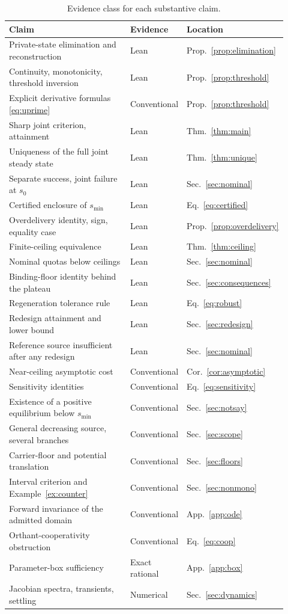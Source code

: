 \documentclass[11pt,a4paper]{article}
\theoremstyle{plain}
\theoremstyle{definition}
\theoremstyle{remark}
\begin{document}
\begin{table}[tb]
\centering\small
\caption{Evidence class for each substantive claim.}
\label{tab:evidence}
\begin{tabular}{p{0.44\linewidth}p{0.18\linewidth}p{0.30\linewidth}}
\toprule
Claim & Evidence & Location\\
\midrule
Private-state elimination and reconstruction & Lean & Prop.~\ref{prop:elimination}\\
Continuity, monotonicity, threshold inversion & Lean & Prop.~\ref{prop:threshold}\\
Explicit derivative formulas \eqref{eq:uprime} & Conventional & Prop.~\ref{prop:threshold}\\
Sharp joint criterion, attainment & Lean & Thm.~\ref{thm:main}\\
Uniqueness of the full joint steady state & Lean & Thm.~\ref{thm:unique}\\
Separate success, joint failure at $s_0$ & Lean & Sec.~\ref{sec:nominal}\\
Certified enclosure of $s_{\min}$ & Lean & Eq.~\eqref{eq:certified}\\
Overdelivery identity, sign, equality case & Lean & Prop.~\ref{prop:overdelivery}\\
Finite-ceiling equivalence & Lean & Thm.~\ref{thm:ceiling}\\
Nominal quotas below ceilings & Lean & Sec.~\ref{sec:nominal}\\
Binding-floor identity behind the plateau & Lean & Sec.~\ref{sec:consequences}\\
Regeneration tolerance rule & Lean & Eq.~\eqref{eq:robust}\\
Redesign attainment and lower bound & Lean & Sec.~\ref{sec:redesign}\\
Reference source insufficient after any redesign & Lean & Sec.~\ref{sec:nominal}\\
Near-ceiling asymptotic cost & Conventional & Cor.~\ref{cor:asymptotic}\\
Sensitivity identities & Conventional & Eq.~\eqref{eq:sensitivity}\\
Existence of a positive equilibrium below $s_{\min}$ & Conventional & Sec.~\ref{sec:notsay}\\
General decreasing source, several branches & Conventional & Sec.~\ref{sec:scope}\\
Carrier-floor and potential translation & Conventional & Sec.~\ref{sec:floors}\\
Interval criterion and Example~\ref{ex:counter} & Conventional & Sec.~\ref{sec:nonmono}\\
Forward invariance of the admitted domain & Conventional & App.~\ref{app:ode}\\
Orthant-cooperativity obstruction & Conventional & Eq.~\eqref{eq:coop}\\
Parameter-box sufficiency & Exact rational & App.~\ref{app:box}\\
Jacobian spectra, transients, settling & Numerical & Sec.~\ref{sec:dynamics}\\
\bottomrule
\end{tabular}
\end{table}
\end{document}

